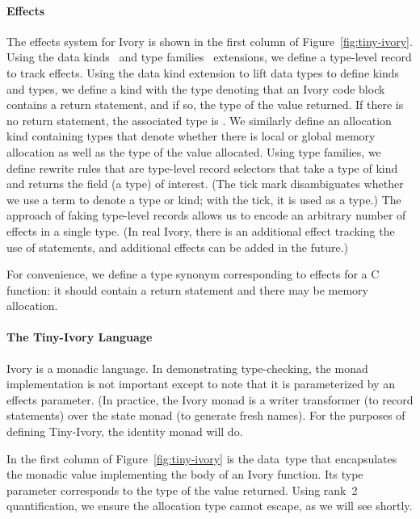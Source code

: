 \paragraph{Effects}
The effects system for Ivory is shown in the first column of
Figure~\ref{fig:tiny-ivory}.  Using the data kinds~\cite{datakinds} and type
families~\cite{typefamilies} extensions, we define a type-level record to track
effects.  Using the data kind extension to lift data types to define kinds and
types, we define a kind  with the type  denoting that an
Ivory code block contains a return statement, and if so, the type of the value
returned.  If there is no return statement, the associated type is .
We similarly define an allocation kind containing types that denote whether
there is local or global memory allocation as well as the type of the value
allocated.  Using type families, we define rewrite rules that are type-level
record selectors that take a type of kind  and returns the field (a
type) of interest.  (The tick mark disambiguates whether we use a term to denote
a type or kind; with the tick, it is used as a type.)  The approach of faking
type-level records allows us to encode an arbitrary number of effects in a
single type.  (In real Ivory, there is an additional effect tracking the use of
 statements, and additional effects can be added in the future.)

For convenience, we define a type synonym  corresponding to
effects for a C function: it should contain a return statement and there may be
memory allocation.

\paragraph{The Tiny-Ivory Language}
Ivory is a monadic language.  In demonstrating type-checking, the monad
implementation is not important except to note that it is parameterized by an
effects parameter.  (In practice, the Ivory monad is a writer transformer (to
record statements) over the state monad (to generate fresh names).  For the
purposes of defining Tiny-Ivory, the identity monad will do.

In the first column of Figure~\ref{fig:tiny-ivory} is the  data~type
that encapsulates the monadic value implementing the body of an Ivory function.
Its type parameter corresponds to the type of the value returned.  Using rank~2
quantification, we ensure the allocation type cannot escape, as we will see shortly.

